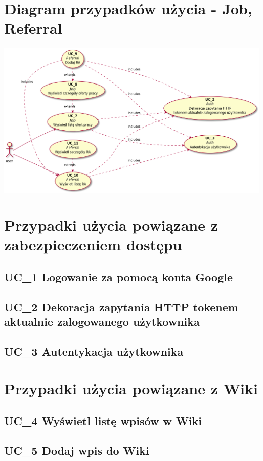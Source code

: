 \documentclass{scrreprt}
\begin{document}
\section{Diagram przypadków użycia - Job, Referral}
\includegraphics[width=\textwidth, keepaspectratio]{graphics/job_referral_use_case_diagram.pdf}

\section{Przypadki użycia powiązane z zabezpieczeniem dostępu}
\subsection{UC\_1 Logowanie za pomocą konta Google}
\subsection{UC\_2 Dekoracja zapytania HTTP tokenem aktualnie zalogowanego użytkownika}
\subsection{UC\_3 Autentykacja użytkownika}

\section{Przypadki użycia powiązane z Wiki}
\subsection{UC\_4 Wyświetl listę wpisów w Wiki}
\subsection{UC\_5 Dodaj wpis do Wiki}
\end{document}
